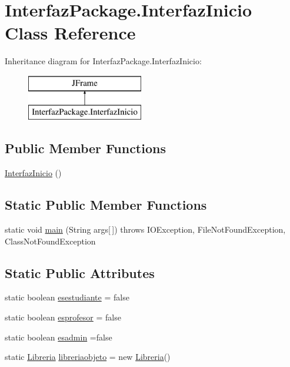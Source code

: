 \hypertarget{class_interfaz_package_1_1_interfaz_inicio}{}\section{Interfaz\+Package.\+Interfaz\+Inicio Class Reference}
\label{class_interfaz_package_1_1_interfaz_inicio}
Inheritance diagram for Interfaz\+Package.\+Interfaz\+Inicio\+:\begin{figure}[H]
\begin{center}
\leavevmode
\includegraphics[height=2.000000cm]{class_interfaz_package_1_1_interfaz_inicio}
\end{center}
\end{figure}
\subsection*{Public Member Functions}
\begin{DoxyCompactItemize}
\item 
\mbox{\hyperlink{class_interfaz_package_1_1_interfaz_inicio_ab0f2775716e858910156769284c39718}{Interfaz\+Inicio}} ()
\end{DoxyCompactItemize}
\subsection*{Static Public Member Functions}
\begin{DoxyCompactItemize}
\item 
static void \mbox{\hyperlink{class_interfaz_package_1_1_interfaz_inicio_a335dc084531a04e4d10683639438e1ec}{main}} (String args\mbox{[}$\,$\mbox{]})  throws I\+O\+Exception, File\+Not\+Found\+Exception, Class\+Not\+Found\+Exception 
\end{DoxyCompactItemize}
\subsection*{Static Public Attributes}
\begin{DoxyCompactItemize}
\item 
static boolean \mbox{\hyperlink{class_interfaz_package_1_1_interfaz_inicio_a54823fb9c7f6a7a2f1916e2be22cbb4b}{esestudiante}} = false
\item 
static boolean \mbox{\hyperlink{class_interfaz_package_1_1_interfaz_inicio_a3113b8b11a9bbe3d80ac5ed1472800ad}{esprofesor}} = false
\item 
static boolean \mbox{\hyperlink{class_interfaz_package_1_1_interfaz_inicio_a2f8c468dd4e32545f2f048a4ddbbc977}{esadmin}} =false
\item 
static \mbox{\hyperlink{classlibreria_1_1_libreria}{Libreria}} \mbox{\hyperlink{class_interfaz_package_1_1_interfaz_inicio_adccd9cfdf4551ca7ae66b2c9caffa049}{libreriaobjeto}} = new \mbox{\hyperlink{classlibreria_1_1_libreria}{Libreria}}()
\end{DoxyCompactItemize}

